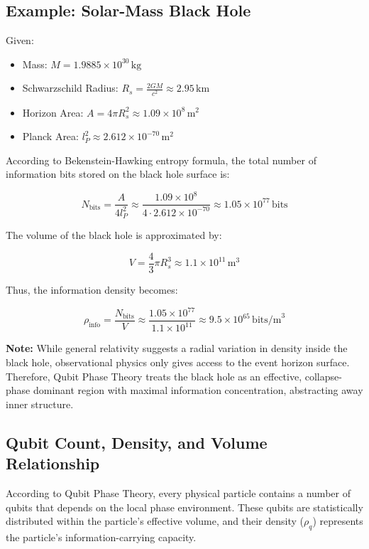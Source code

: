 \documentclass[12pt]{report} %
\begin{document}
\subsection*{Example: Solar-Mass Black Hole}

Given:
\begin{itemize}
  \item Mass: \( M = 1.9885 \times 10^{30} \, \text{kg} \)
  \item Schwarzschild Radius: \( R_s = \frac{2GM}{c^2} \approx 2.95 \, \text{km} \)
  \item Horizon Area: \( A = 4\pi R_s^2 \approx 1.09 \times 10^8 \, \text{m}^2 \)
  \item Planck Area: \( l_P^2 \approx 2.612 \times 10^{-70} \, \text{m}^2 \)
\end{itemize}

According to Bekenstein-Hawking entropy formula, the total number of information bits stored on the black hole surface is:

\[
N_{\text{bits}} = \frac{A}{4 l_P^2} \approx \frac{1.09 \times 10^8}{4 \cdot 2.612 \times 10^{-70}} \approx 1.05 \times 10^{77} \, \text{bits}
\]

The volume of the black hole is approximated by:

\[
V = \frac{4}{3} \pi R_s^3 \approx 1.1 \times 10^{11} \, \text{m}^3
\]

Thus, the information density becomes:

\[
\rho_{\text{info}} = \frac{N_{\text{bits}}}{V} \approx \frac{1.05 \times 10^{77}}{1.1 \times 10^{11}} \approx 9.5 \times 10^{65} \, \text{bits/m}^3
\]

\textbf{Note:} While general relativity suggests a radial variation in density inside the black hole, observational physics only gives access to the event horizon surface. Therefore, Qubit Phase Theory treats the black hole as an effective, collapse-phase dominant region with maximal information concentration, abstracting away inner structure.
\subsection{Qubit Count, Density, and Volume Relationship}

According to Qubit Phase Theory, every physical particle contains a number of qubits that depends on the local phase environment. These qubits are statistically distributed within the particle's effective volume, and their density ($\rho_q$) represents the particle's information-carrying capacity.
\end{document}
